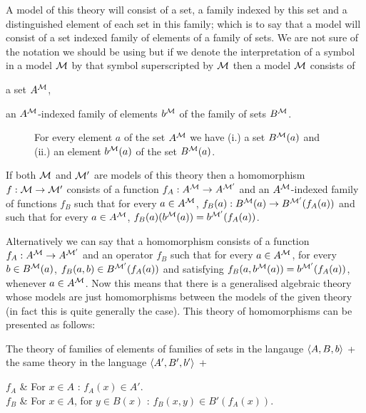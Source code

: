 A model of this theory will consist of a set, a family indexed by this set and a distinguished element of each set in this family; which is to say that a model will consist of a set indexed family of elements of a family of sets.
%
We are not sure of the notation we should be using but if we denote the interpretation of a symbol in a model $\mathcal{M}$ by that symbol superscripted by $\mathcal{M}$ then a model $\mathcal{M}$ consists of \begin{enumerate*}[(i.)] \item a set $A^{\mathcal{M}}$, \item an $A^{\mathcal{M}}$-indexed family of elements $b^{\mathcal{M}}$ of the family of sets $B^{\mathcal{M}}$. \end{enumerate*}

\begin{figure}
\caption{For every element $a$ of the set $A^{\mathcal{M}}$ we have (i.) a set $B^{\mathcal{M}}(a)$ and (ii.) an element $b^{\mathcal{M}}(a)$ of the set $B^{\mathcal{M}}(a)$.}
\end{figure}


If both $\mathcal{M}$ and $\mathcal{M}'$ are models of this theory then a homomorphism $f : \mathcal{M} \to \mathcal{M}'$ consists of a function $f_A : A^{\mathcal{M}} \to A^{\mathcal{M}'}$ and an $A^{\mathcal{M}}$-indexed family of functions $f_B$ such that for every $a \in A^{\mathcal{M}}$, $f_B(a) : B^{\mathcal{M}}(a) \to B^{\mathcal{M}'}(f_A(a))$ and such that for every $a \in A^{\mathcal{M}}$, $f_B(a)(b^{\mathcal{M}}(a)) = b^{\mathcal{M}'}(f_A(a))$.

Alternatively we can say that a homomorphism consists of a function $f_A : A^{\mathcal{M}} \to A^{\mathcal{M}'}$ and an operator $f_B$ such that for every $a \in A^{\mathcal{M}}$, for every $b \in B^{\mathcal{M}}(a)$, $f_B(a,b) \in B^{\mathcal{M}'}(f_A(a))$ and satisfying $f_B(a,b^{\mathcal{M}}(a)) = b^{\mathcal{M}'}(f_A(a))$, whenever $a \in A^{\mathcal{M}}$.
%
Now this means that there is a generalised algebraic theory whose models are just homomorphisms between the models of the given theory (in fact this is quite generally the case).
%
This theory of homomorphisms can be presented as follows:

The theory of families of elements of families of sets in the langauge $\langle A,B,b \rangle$ + the same theory in the language $\langle A',B',b' \rangle$ + \\
\begin{theoryspec}
  $f_A$ & For $x \in A$ : $f_A(x) \in A'$. \\
  $f_B$ & For $x \in A$, for $y \in B(x)$ : $f_B(x,y) \in B'(f_A(x))$. \\
  \oneaxiom
\end{theoryspec}

